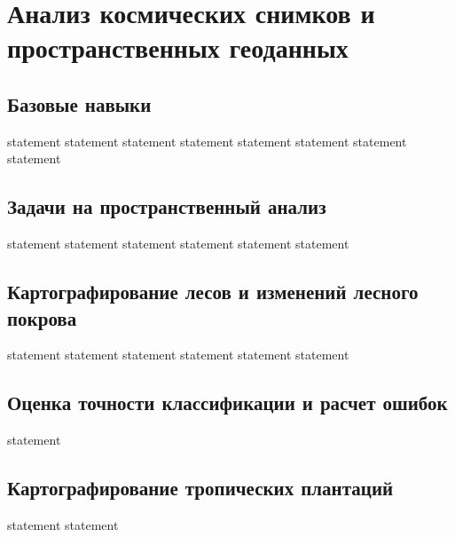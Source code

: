\chapter{Анализ космических снимков и пространственных геоданных}

\section{Базовые навыки}

{statement}
{statement}
{statement}
{statement}
{statement}
{statement}
{statement}
{statement}

\section{Задачи на пространственный анализ}

{statement}
{statement}
{statement}
{statement}
{statement}
{statement}

\section{Картографирование лесов и изменений лесного покрова}

{statement}
{statement}
{statement}
{statement}
{statement}
{statement}

\section{Оценка точности классификации и расчет ошибок}

{statement}

\section{Картографирование тропических плантаций}

{statement}
{statement}